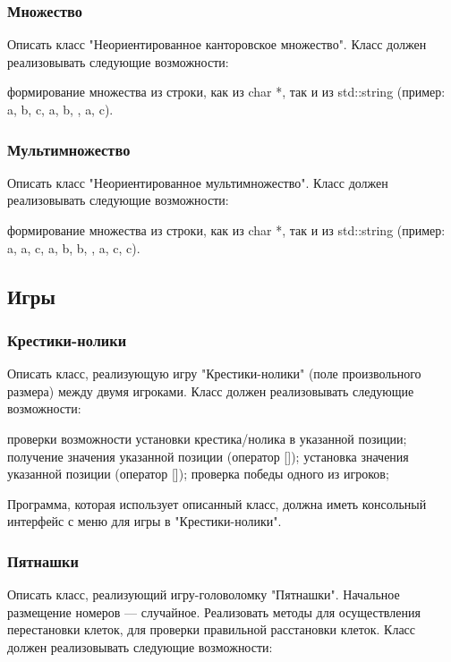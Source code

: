 \documentclass[a4paper,12pt]{article}
\begin{document}
\subsubsection{Множество}

Описать класс "Неориентированное канторовское множество".  Класс
должен реализовывать следующие возможности:

формирование множества из строки, как из char *, так и из std::string (пример: {a, b, c, {a, b}, {}, {a, {c}}}). 

\subsubsection{Мультимножество}

Описать класс "Неориентированное мультимножество".
Класс должен реализовывать следующие возможности:

формирование множества из строки, как из char *, так и из std::string (пример: {a, a, c, {a, b, b}, {}, {a, {c, c}}}). 


\subsection{Игры}

\subsubsection{Крестики-нолики}

Описать класс, реализующую игру "Крестики-нолики" (поле произвольного размера) между двумя игроками.
Класс должен реализовывать следующие возможности:

проверки возможности установки крестика/нолика в указанной позиции;
получение значения указанной позиции (оператор []);
установка значения указанной позиции (оператор []);
проверка победы одного из игроков; 

Программа, которая использует описанный класс, должна иметь консольный интерфейс с меню для игры в "Крестики-нолики".

\subsubsection{Пятнашки}

Описать класс, реализующий игру-головоломку "Пятнашки". Начальное
размещение номеров — случайное. Реализовать методы для осуществления
перестановки клеток, для проверки правильной расстановки клеток.
Класс должен реализовывать следующие возможности:
\end{document}
